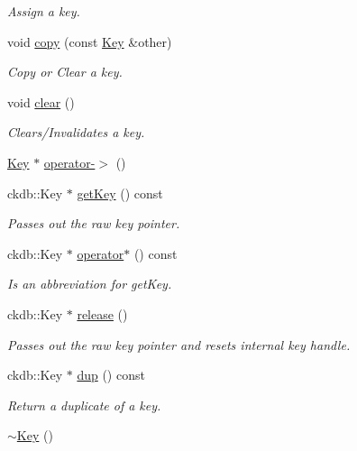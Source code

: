 \begin{DoxyCompactItemize}
\begin{DoxyCompactList}\small\item\em Assign a key. \end{DoxyCompactList}\item 
void \hyperlink{classkdb_1_1Key_ab5bc93e22f4cf40b9d2b1fc32cc260be}{copy} (const \hyperlink{classkdb_1_1Key}{Key} \&other)
\begin{DoxyCompactList}\small\item\em Copy or Clear a key. \end{DoxyCompactList}\item 
void \hyperlink{classkdb_1_1Key_a33a112681b0b2e94e6d369c0f89e361b}{clear} ()
\begin{DoxyCompactList}\small\item\em Clears/\+Invalidates a key. \end{DoxyCompactList}\item 
\hyperlink{classkdb_1_1Key}{Key} $\ast$ \hyperlink{classkdb_1_1Key_ab64ec9d578e083dad3e43322535cf108}{operator-\/$>$} ()
\item 
ckdb\+::\+Key $\ast$ \hyperlink{classkdb_1_1Key_a6be9b3bb17434fd4362d137183d51100}{get\+Key} () const
\begin{DoxyCompactList}\small\item\em Passes out the raw key pointer. \end{DoxyCompactList}\item 
ckdb\+::\+Key $\ast$ \hyperlink{classkdb_1_1Key_a66e5af2387ebb86efa465ba2e844cafd}{operator$\ast$} () const
\begin{DoxyCompactList}\small\item\em Is an abbreviation for get\+Key. \end{DoxyCompactList}\item 
ckdb\+::\+Key $\ast$ \hyperlink{classkdb_1_1Key_a9ae719043e6e99f5f3d6fb85837306f8}{release} ()
\begin{DoxyCompactList}\small\item\em Passes out the raw key pointer and resets internal key handle. \end{DoxyCompactList}\item 
ckdb\+::\+Key $\ast$ \hyperlink{classkdb_1_1Key_ababb1ccd9f18db379eb4a62f8db87bf5}{dup} () const
\begin{DoxyCompactList}\small\item\em Return a duplicate of a key. \end{DoxyCompactList}\item 
\hyperlink{classkdb_1_1Key_a35dd6ae58d125a298e30aed13b15c1f4}{$\sim$\+Key} ()

\end{DoxyCompactItemize}
